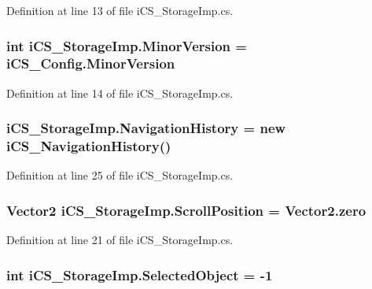 Definition at line 13 of file i\+C\+S\+\_\+\+Storage\+Imp.\+cs.

\hypertarget{classi_c_s___storage_imp_a4b0896c23eda86c96fe754c9ad24f98c}{
\subsubsection[{Minor\+Version}]{\setlength{\rightskip}{0pt plus 5cm}int i\+C\+S\+\_\+\+Storage\+Imp.\+Minor\+Version = i\+C\+S\+\_\+\+Config.\+Minor\+Version}}\label{classi_c_s___storage_imp_a4b0896c23eda86c96fe754c9ad24f98c}


Definition at line 14 of file i\+C\+S\+\_\+\+Storage\+Imp.\+cs.

\hypertarget{classi_c_s___storage_imp_a3677485efa65faf577ad1a23571aa236}{
\subsubsection[{Navigation\+History}]{ i\+C\+S\+\_\+\+Storage\+Imp.\+Navigation\+History = new {\bf i\+C\+S\+\_\+\+Navigation\+History}()}}\label{classi_c_s___storage_imp_a3677485efa65faf577ad1a23571aa236}


Definition at line 25 of file i\+C\+S\+\_\+\+Storage\+Imp.\+cs.

\hypertarget{classi_c_s___storage_imp_abae5052e656f28aa226f290b581d4ec4}{
\subsubsection[{Scroll\+Position}]{\setlength{\rightskip}{0pt plus 5cm}Vector2 i\+C\+S\+\_\+\+Storage\+Imp.\+Scroll\+Position = Vector2.\+zero}}\label{classi_c_s___storage_imp_abae5052e656f28aa226f290b581d4ec4}


Definition at line 21 of file i\+C\+S\+\_\+\+Storage\+Imp.\+cs.

\hypertarget{classi_c_s___storage_imp_aab60dd1eaaa3f322278473bd55ba45d4}{
\subsubsection[{Selected\+Object}]{\setlength{\rightskip}{0pt plus 5cm}int i\+C\+S\+\_\+\+Storage\+Imp.\+Selected\+Object = -\/1}}\label{classi_c_s___storage_imp_aab60dd1eaaa3f322278473bd55ba45d4}



